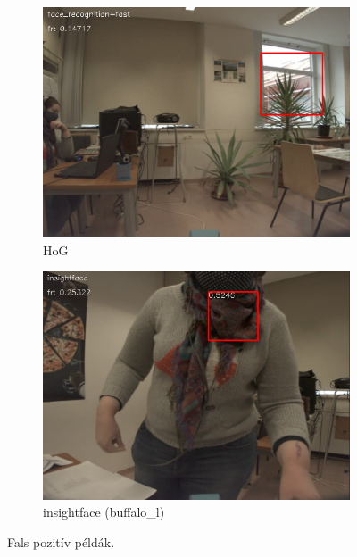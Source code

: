 \begin{figure}
\begin{subfigure}[b]{0.3\linewidth}
        \includegraphics[width=\linewidth]{figures/video_comparison/false_positives/video_comparison_face_recognition_false_positive.png}
        \caption{HoG}
    \end{subfigure}
    \begin{subfigure}[b]{0.3\linewidth}
        \includegraphics[width=\linewidth]{figures/video_comparison/false_positives/video_comparison_insightface_false_positive.png}
        \caption{insightface (buffalo\_l)}
    \end{subfigure}
    \caption{Fals pozitív példák.}
    \label{fig:false_positives}
\end{figure}

